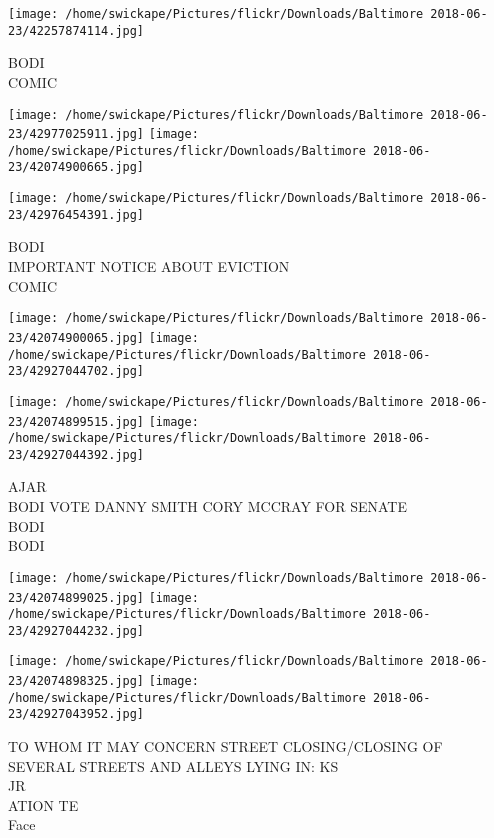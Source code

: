 \documentclass[10pt,letterpaper]{article}
\begin{document}
\vspace{0.25in}
\texttt{[image: /home/swickape/Pictures/flickr/Downloads/Baltimore 2018-06-23/42257874114.jpg]}

BODI\\
COMIC\\
\pagebreak

\texttt{[image: /home/swickape/Pictures/flickr/Downloads/Baltimore 2018-06-23/42977025911.jpg]}
\texttt{[image: /home/swickape/Pictures/flickr/Downloads/Baltimore 2018-06-23/42074900665.jpg]}

\vspace{0.25in}
\texttt{[image: /home/swickape/Pictures/flickr/Downloads/Baltimore 2018-06-23/42976454391.jpg]}

BODI\\
IMPORTANT NOTICE ABOUT EVICTION\\
COMIC\\
\pagebreak

\texttt{[image: /home/swickape/Pictures/flickr/Downloads/Baltimore 2018-06-23/42074900065.jpg]}
\texttt{[image: /home/swickape/Pictures/flickr/Downloads/Baltimore 2018-06-23/42927044702.jpg]}

\texttt{[image: /home/swickape/Pictures/flickr/Downloads/Baltimore 2018-06-23/42074899515.jpg]}
\texttt{[image: /home/swickape/Pictures/flickr/Downloads/Baltimore 2018-06-23/42927044392.jpg]}

AJAR\\
BODI VOTE DANNY SMITH CORY MCCRAY FOR SENATE\\
BODI\\
BODI\\
\pagebreak

\texttt{[image: /home/swickape/Pictures/flickr/Downloads/Baltimore 2018-06-23/42074899025.jpg]}
\texttt{[image: /home/swickape/Pictures/flickr/Downloads/Baltimore 2018-06-23/42927044232.jpg]}

\texttt{[image: /home/swickape/Pictures/flickr/Downloads/Baltimore 2018-06-23/42074898325.jpg]}
\texttt{[image: /home/swickape/Pictures/flickr/Downloads/Baltimore 2018-06-23/42927043952.jpg]}

TO WHOM IT MAY CONCERN STREET CLOSING/CLOSING OF SEVERAL STREETS AND ALLEYS LYING IN: KS\\
JR\\
ATION TE\\
Face\\
\pagebreak
\end{document}
